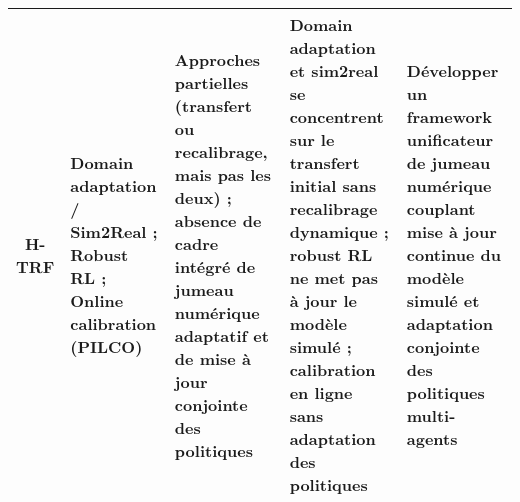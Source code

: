 \begin{table}[H]
{\begin{tabularx}{\textwidth}{cXXXX}
      \textbf{H-TRF}
       & Domain adaptation / Sim2Real ; Robust RL ; Online calibration (PILCO)
       & Approches partielles (transfert ou recalibrage, mais pas les deux) ; absence de cadre intégré de jumeau numérique adaptatif et de mise à jour conjointe des politiques
       & Domain adaptation et sim2real se concentrent sur le transfert initial sans recalibrage dynamique ; robust RL ne met pas à jour le modèle simulé ; calibration en ligne sans adaptation des politiques
       & Développer un framework unificateur de jumeau numérique couplant mise à jour continue du modèle simulé et adaptation conjointe des politiques multi-agents                                            \\
      \hline
    \end{tabularx}
  }
\end{table}
